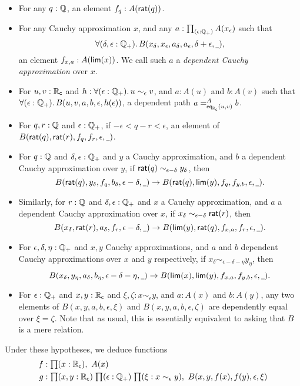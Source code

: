 \begin{itemize}
\item For any $q : \Q$, an element $f_q:A(\rcrat(q))$.
\item For any Cauchy approximation $x$, and any $a:\prd{\epsilon:\Qp} A(x_\epsilon)$ such that
  \begin{equation}
    \fall{\delta, \epsilon : \Qp} B(x_\delta,x_\epsilon,a_\delta,a_\epsilon,\delta+\epsilon,\blank),\label{eq:depCauchyappx}
  \end{equation}
  an element $f_{x,a}:A(\rclim(x))$.  We call such $a$ a \emph{dependent Cauchy approximation} over $x$.
\item For $u, v : \RC$ and $h:\fall{\epsilon : \Qp} u \sim_\epsilon v$, and $a:A(u)$ and $b:A(v)$ such that $\fall{\epsilon:\Qp} B(u,v,a,b,\epsilon,h(\epsilon))$, a dependent path $\dpath{A}{\rceq(u,v)}{a}{b}$.
\item For $q,r:\Q$ and $\epsilon:\Qp$, if $-\epsilon < q - r < \epsilon$, an element of $B(\rcrat(q),\rcrat(r),f_q,f_r,\epsilon,\blank)$.
\item For $q:\Q$ and $\delta,\epsilon:\Qp$ and $y$ a Cauchy approximation, and $b$ a dependent Cauchy approximation over $y$, if $\rcrat(q) \sim_{\epsilon - \delta} y_\delta$, then
  \[B(\rcrat(q),y_\delta,f_q,b_\delta,\epsilon-\delta,\blank)
  \to
  B(\rcrat(q),\rclim(y),f_q,f_{y,b},\epsilon,\blank).\]
\item Similarly, for $r:\Q$ and $\delta,\epsilon:\Qp$ and $x$ a Cauchy approximation, and $a$ a dependent Cauchy approximation over $x$, if $x_\delta \sim_{\epsilon - \delta} \rcrat(r)$, then
  \[B(x_\delta,\rcrat(r),a_\delta,f_r,\epsilon-\delta,\blank) \to
  B(\rclim(y),\rcrat(q),f_{x,a},f_r,\epsilon,\blank).
  \]
\item For $\epsilon,\delta,\eta:\Qp$ and $x,y$ Cauchy approximations, and $a$ and $b$ dependent Cauchy approximations over $x$ and $y$ respectively, if $x_\delta \sim_{\epsilon - \delta - \eta} y_\eta$, then
  \[ B(x_\delta,y_\eta,a_\delta,b_\eta,{\epsilon - \delta - \eta},\blank)\to
  B(\rclim(x),\rclim(y),f_{x,a},f_{y,b},\epsilon,\blank).\]
\item For $\epsilon:\Qp$ and $x,y:\RC$ and $\xi,\zeta:x\sim_{\epsilon} y$, and $a:A(x)$ and $b:A(y)$, any two elements of $B(x,y,a,b,\epsilon,\xi)$ and $B(x,y,a,b,\epsilon,\zeta)$ are dependently equal over $\xi=\zeta$.
  Note that as usual, this is essentially equivalent to asking that $B$ is a mere relation.
\end{itemize}
Under these hypotheses, we deduce functions
\begin{align*}
  f&:\prd{x:\RC} A(x)\\
  g&:\prd{x,y:\RC}{\epsilon:\Qp}{\xi:x\sim_{\epsilon} y} B(x,y,f(x),f(y),\epsilon,\xi)
\end{align*}
